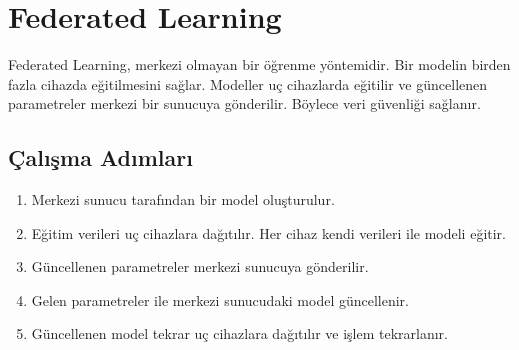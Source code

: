 \section{Federated Learning}
Federated Learning, merkezi olmayan bir öğrenme yöntemidir. Bir modelin birden fazla cihazda eğitilmesini sağlar. Modeller uç cihazlarda eğitilir ve güncellenen parametreler merkezi bir sunucuya gönderilir. Böylece veri güvenliği sağlanır.

\subsection{Çalışma Adımları}
\begin{enumerate}
    \item Merkezi sunucu tarafından bir model oluşturulur.
    \item Eğitim verileri uç cihazlara dağıtılır. Her cihaz kendi verileri ile modeli eğitir.
    \item Güncellenen parametreler merkezi sunucuya gönderilir.
    \item Gelen parametreler ile merkezi sunucudaki model güncellenir.
    \item Güncellenen model tekrar uç cihazlara dağıtılır ve işlem tekrarlanır. 
\end{enumerate}

\newpage